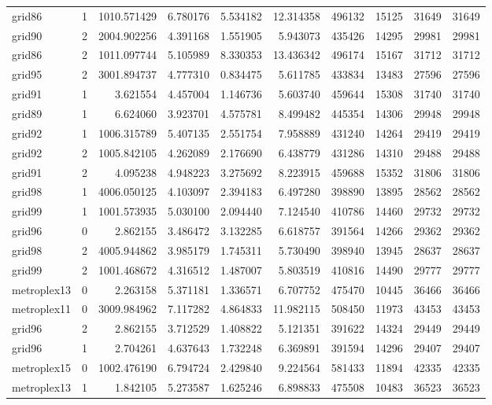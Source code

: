 \begin{longtable}{|l|r|r|r|r|r|r|r|r|r|}
grid86 & 1 & 1010.571429 & 6.780176 & 5.534182 & 12.314358 & 496132 & 15125 & 31649 & 31649 \\
grid90 & 2 & 2004.902256 & 4.391168 & 1.551905 & 5.943073 & 435426 & 14295 & 29981 & 29981 \\
grid86 & 2 & 1011.097744 & 5.105989 & 8.330353 & 13.436342 & 496174 & 15167 & 31712 & 31712 \\
grid95 & 2 & 3001.894737 & 4.777310 & 0.834475 & 5.611785 & 433834 & 13483 & 27596 & 27596 \\
grid91 & 1 & 3.621554 & 4.457004 & 1.146736 & 5.603740 & 459644 & 15308 & 31740 & 31740 \\
grid89 & 1 & 6.624060 & 3.923701 & 4.575781 & 8.499482 & 445354 & 14306 & 29948 & 29948 \\
grid92 & 1 & 1006.315789 & 5.407135 & 2.551754 & 7.958889 & 431240 & 14264 & 29419 & 29419 \\
grid92 & 2 & 1005.842105 & 4.262089 & 2.176690 & 6.438779 & 431286 & 14310 & 29488 & 29488 \\
grid91 & 2 & 4.095238 & 4.948223 & 3.275692 & 8.223915 & 459688 & 15352 & 31806 & 31806 \\
grid98 & 1 & 4006.050125 & 4.103097 & 2.394183 & 6.497280 & 398890 & 13895 & 28562 & 28562 \\
grid99 & 1 & 1001.573935 & 5.030100 & 2.094440 & 7.124540 & 410786 & 14460 & 29732 & 29732 \\
grid96 & 0 & 2.862155 & 3.486472 & 3.132285 & 6.618757 & 391564 & 14266 & 29362 & 29362 \\
grid98 & 2 & 4005.944862 & 3.985179 & 1.745311 & 5.730490 & 398940 & 13945 & 28637 & 28637 \\
grid99 & 2 & 1001.468672 & 4.316512 & 1.487007 & 5.803519 & 410816 & 14490 & 29777 & 29777 \\
metroplex13 & 0 & 2.263158 & 5.371181 & 1.336571 & 6.707752 & 475470 & 10445 & 36466 & 36466 \\
metroplex11 & 0 & 3009.984962 & 7.117282 & 4.864833 & 11.982115 & 508450 & 11973 & 43453 & 43453 \\
grid96 & 2 & 2.862155 & 3.712529 & 1.408822 & 5.121351 & 391622 & 14324 & 29449 & 29449 \\
grid96 & 1 & 2.704261 & 4.637643 & 1.732248 & 6.369891 & 391594 & 14296 & 29407 & 29407 \\
metroplex15 & 0 & 1002.476190 & 6.794724 & 2.429840 & 9.224564 & 581433 & 11894 & 42335 & 42335 \\
metroplex13 & 1 & 1.842105 & 5.273587 & 1.625246 & 6.898833 & 475508 & 10483 & 36523 & 36523 \\

\end{longtable}
